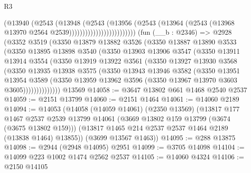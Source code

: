 \begin{lexlean}{R3}
\begin{coremodule}
                                    (@13940
                                      (@2543
                                        (@13948
                                          (@2543
                                            (@13956
                                              (@2543
                                                (@13964
                                                  (@2543
                                                    (@13968
                                                      @13970
                                                      @2564
                                                      @2539)))))))))))))))))))))))))
    (fun (__b : @2346) =>
    @2928
      (@3352
        @3519
        (@3350
          @13879
          @13882
          @3526
          (@3350
            @13887
            @13890
            @3533
            (@3350
              @13895
              @13898
              @3540
              (@3350
                @13903
                @13906
                @3547
                (@3350
                  @13911
                  @13914
                  @3554
                  (@3350
                    @13919
                    @13922
                    @3561
                    (@3350
                      @13927
                      @13930
                      @3568
                      (@3350
                        @13935
                        @13938
                        @3575
                        (@3350
                          @13943
                          @13946
                          @3582
                          (@3350
                            @13951
                            @13954
                            @3589
                            (@3350
                              @13959
                              @13962
                              @3596
                              (@3350 @13967 @13970 @3603 @3605))))))))))))))
    @13569
@14058 := @3647 @13802 @661 @1468 @2540 @2537
@14059 := @2151 @13799
@14060 := @2151 @1464
@14061 := @14060 @2189
@14094 := @14053
    (@14058
      (@14059 @14061)
      (@2350 @13569)
      (@13817
        @177
        @1467
        @2537
        @2539
        @13799
        @14061
        (@3669 @13802 @159 @13799 (@3674 (@3675 @13802 @159)))
        (@13817 @1465 @214 @2537 @2537 @1464 @2189 (@13838 @1464) @13855))
      (@3699 @13567 @1463))
@14095 := @288 @13875
@14098 := @2944 (@2948 @14095) @2951
@14099 := @3705 @14098
@14104 := @14099 @223 @1002 @1474 @2562 @2537
@14105 := @14060 @4324
@14106 := @2150 @14105

\end{coremodule}
\end{lexlean}
